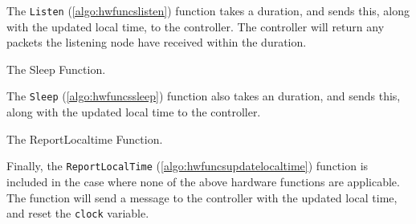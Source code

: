 The \texttt{Listen} (\autoref{algo:hwfuncslisten}) function takes a duration, and sends this, along with the updated local time, to the controller. The controller will return any packets the listening node have received within the duration.\medbreak

\begin{algorithm}[ht]
    \DontPrintSemicolon
    
    
    \caption{The Sleep Function.}
    \label{algo:hwfuncssleep}
\end{algorithm}

The \texttt{Sleep} (\autoref{algo:hwfuncssleep}) function also takes an duration, and sends this, along with the updated local time to the controller.\medbreak

\begin{algorithm}[ht]
    \DontPrintSemicolon
    
    
    \caption{The ReportLocaltime Function.}
    \label{algo:hwfuncsupdatelocaltime}
\end{algorithm}

Finally, the \texttt{ReportLocalTime} (\autoref{algo:hwfuncsupdatelocaltime}) function is included in the case where none of the above hardware functions are applicable. The function will send a message to the controller with the updated local time, and reset the \texttt{clock} variable.